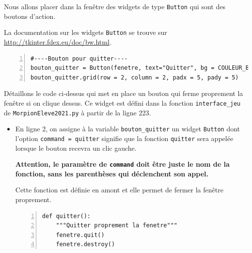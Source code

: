 \documentclass[a4paper, french, 12pt]{article}  %
\newcounter{act}
\newcounter{def}
\newcounter{prop}
\begin{document}
Nous allons placer dans la fenêtre des  widgets de type  \lstinline+Button+ qui sont des boutons d'action.  

La documentation sur les widgets \lstinline+Button+ se trouve sur \url{http://tkinter.fdex.eu/doc/bw.html}.

\begin{lstlisting}[numbers=left]
#----Bouton pour quitter----
bouton_quitter = Button(fenetre, text="Quitter", bg = COULEUR_BOUTON, relief = 'raised',  command = quitter)
bouton_quitter.grid(row = 2, column = 2, padx = 5, pady = 5)
\end{lstlisting}

Détaillons le code ci-dessus qui met en place un bouton qui ferme proprement la fenêtre si on clique dessus. Ce widget est défini dans la fonction \lstinline+interface_jeu+ de \texttt{MorpionEleve2021.py} à partir de la ligne 223.


\begin{itemize}[label=]
	\item En ligne 2, on assigne à la variable \lstinline+bouton_quitter+  un widget \lstinline+Button+ dont l'option \lstinline+command = quitter+ signifie que la fonction \lstinline+quitter+ sera appelée lorsque le bouton recevra un clic gauche. 
	
{\bfseries \bcattention{} Attention, le paramètre de \lstinline+command+ doit être juste le nom de la fonction, sans les parenthèses qui déclenchent son appel. }


	
	Cette fonction est définie en amont et elle permet de fermer la fenêtre proprement.

\begin{lstlisting}[numbers=left]
def quitter():
    """Quitter proprement la fenetre"""
    fenetre.quit()
    fenetre.destroy()
\end{lstlisting}
	
\end{itemize}
\end{document}
